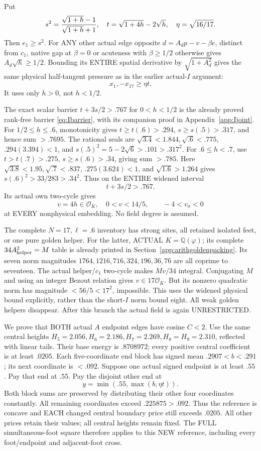 Put
\[
 s^2={\sqrt{1+h}-1\over\sqrt{1+h}+1},\quad
 t=\sqrt{1+4h}-2\sqrt h,\quad\eta=\sqrt{16/17}.
\]
Then \(e_1\ge s^2\).
For ANY other actual edge opposite
\(d=A_dp-v-\beta e\), distinct from
\(c_1\), native gap at \(\beta=0\) or
acuteness with \(\beta\ge1/2\) otherwise
gives \(A_d\sqrt h\ge1/2\).
Bounding its ENTIRE spatial derivative by
\(\sqrt{1+A_d^2}\) gives the same physical
half-tangent pressure as in the earlier
actual-\(I\) argument:
\[
                       x_1,-x_{17}\ge\eta t .
\]
It uses only \(h>0\), not \(h<1/2\).

The exact scalar barrier \(t+3s/2>.767\)
for \(0<h<1/2\) is the already proved
rank-free barrier \eqref{eq:Ibarrier},
with its companion proof in Appendix~\ref{app:Ijoint}.
For \(1/2\le h\le.6\), monotonicity gives
\(t\ge t(.6)>.294\), \(s\ge s(.5)>.317\),
and hence sum \(>.7695\).
The rational seals are
\(\sqrt{3.4}<1.844,\sqrt{.6}<.775\),
\(.294(3.394)<1\), and
\(s(.5)^2=5-2\sqrt6>.101>.317^2\).
For \(.6\le h<.7\), use
\(t>t(.7)>.275\), \(s\ge s(.6)>.34\),
giving sum \(>.785\).
Here
\(\sqrt{3.8}<1.95,\sqrt{.7}<.837\),
\(.275(3.624)<1\), and
\(\sqrt{1.6}>1.264\) gives
\(s(.6)^2>33/283>.34^2\).
Thus on the ENTIRE widened interval
\[
                              t+3s/2>.767 .
\]
Its actual own two-cycle gives
\[
 v=4h\in\mathcal O_K,\quad0<v<14/5,\qquad
                        -4<v_\sigma<0
\]
at EVERY nonphysical embedding.
No field degree is assumed.

The complete \(N=17,\ell=.6\) inventory
has strong sites, all retained isolated
feet, or one pure golden helper.
For the latter, ACTUAL \(K=\mathbb Q(\varphi)\);
its complete \(34A_{\rm helper}^2=M\)
table is already printed in
Section~\ref{app:arithgoldenpacking}.
Its seven norm magnitudes
\(1764,1216,716,324,196,36,76\) are
all coprime to seventeen.
The actual helper/\(c_1\) two-cycle
makes \(Mv/34\) integral.
Conjugating \(M\) and using an integer
Bezout relation gives \(v\in17\mathcal O_K\).
But its nonzero quadratic norm has magnitude
\(<56/5<17^2\), impossible.
This uses the widened physical bound
explicitly, rather than the short-\(I\)
norm bound eight.
All weak golden helpers disappear.
After this branch the actual field is
again UNRESTRICTED.

We prove that BOTH actual \(A\) endpoint
edges have cosine \(C<2\).
Use the same central heights
\(H_5=2.056,H_6=2.186,H_7=2.269,H_8=H_9=2.310\),
reflected with linear tails.
Their base energy is \(.8708972\);
every positive central coefficient is
at least \(.0205\).
Each five-coordinate end block has signed
mean \(.2907<b<.291\); its next coordinate
is \(<.092\).
Suppose one actual signed endpoint is
at least \(.55\).
Pay that end at \(.55\).
Pay the disjoint other end at
\[
                         y=\min(.55,\max(b,\eta t)).
\]
Both block sums are preserved by distributing
their other four coordinates constantly.
All remaining coordinates exceed
\(.225875>.092\).
Thus the reference is concave and EACH
changed central boundary price still
exceeds \(.0205\).
All other prices retain their values;
all central heights remain fixed.
The FULL simultaneous-foot square therefore
applies to this NEW reference, including
every foot/endpoint and adjacent-foot cross.

